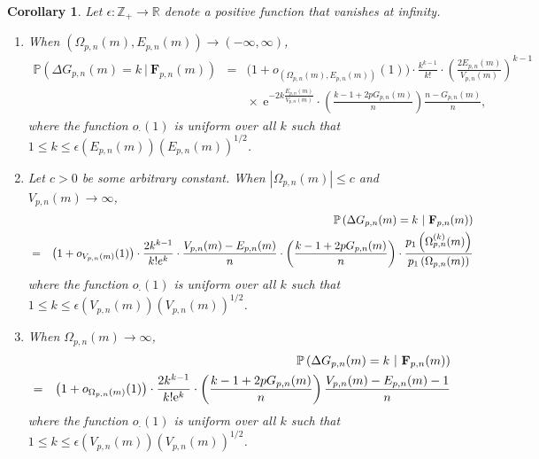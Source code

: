 \documentclass[a4, 11pt]{article}
\numberwithin{equation}{section}
\theoremstyle{plain}
\newtheorem{corollary}[theorem]{Corollary}
\theoremstyle{definition}
\theoremstyle{remark}
\begin{document}
\begin{corollary}\label{corol:est_transitions} Let $\epsilon:\mathbb Z_+ \rightarrow \mathbb R$ denote a positive function that vanishes at infinity. 
\begin{enumerate}[topsep=0cm]
\item[\emph{1)}] When $(\Omega_{p,n}(m),E_{p,n}(m))\to (-\infty,\infty)$,  
\begin{eqnarray*}
\mathbb{P}\left( \Delta G_{p,n}(m)=k ~ | ~\mathbf{F}_{p,n}(m)\right) &=& \big(1+o_{(\Omega_{p,n}(m),E_{p,n}(m))}(1)\big) \cdot \frac{k^{k-1}}{k!} \cdot \left(\frac{2E_{p,n}(m)}{V_{p,n}(m)}\right)^{k-1}\\
&& \hspace{0cm} \times  ~\mathrm{e}^{-2k\frac{E_{p,n}(m)}{V_{p,n}(m)}} \cdot \left(\frac{k-1+2pG_{p,n}(m)}{n}\right)\frac{n-G_{p,n}(m)}{n},
\end{eqnarray*}	
where the function $o_{\cdot}(1)$ is uniform over all $k$ such that $1\leq k\leq \epsilon(E_{p,n}(m))\left(E_{p,n}(m) \right)^{1/2}$.
\item[\emph{2)}] Let $c>0$ be some arbitrary constant.  When $\left\vert \Omega_{p,n}(m)\right\vert \leq c $ and $V_{p,n}(m) \rightarrow \infty$,
\begin{eqnarray*}
&& \hspace{-1cm}
	\mathbb{P}\left( \Delta G_{p,n}(m)=k ~ | ~\mathbf{F}_{p,n}(m)\right) \\
	&=& \big(1+o_{V_{p,n}(m)}(1)\big) \cdot \frac{2k^{k-1}}{k!e^k} \cdot \frac{V_{p,n}(m)-E_{p,n}(m)}{n} \cdot \left(\frac{k-1+2pG_{p,n}(m)}{n}\right) \cdot \frac{p_1\left(\Omega_{p,n}^{(k)}(m)\right)}{p_1\left(\Omega_{p,n}(m)\right)} 
\end{eqnarray*}	
where the function $o_{\cdot}(1)$ is uniform over all $k$ such that $1\leq k\leq \epsilon(V_{p,n}(m))\left(V_{p,n}(m)\right)^{1/2}$. 
\item[\emph{3)}] When $\Omega_{p,n}(m)\to \infty$,
\begin{eqnarray*}
	&& \hspace{-2cm} \mathbb{P}\left( \Delta G_{p,n}(m)=k ~ | ~\mathbf{F}_{p,n}(m)\right) \\
	&=&\big(1+o_{\Omega_{p,n}(m)}(1)\big) \cdot \frac{2k^{k-1}}{k!\mathrm{e}^k}\cdot \left(\frac{k-1+2pG_{p,n}(m)}{n}\right)\frac{{V_{p,n}(m)-E_{p,n}(m)-1}}{n}
\end{eqnarray*}
where the function $o_{\cdot}(1)$ is uniform over all $k$ such that $1\leq k\leq \epsilon(V_{p,n}(m))\left(V_{p,n}(m)\right)^{1/2}$.
\end{enumerate}	
\end{corollary} 
\end{document}
